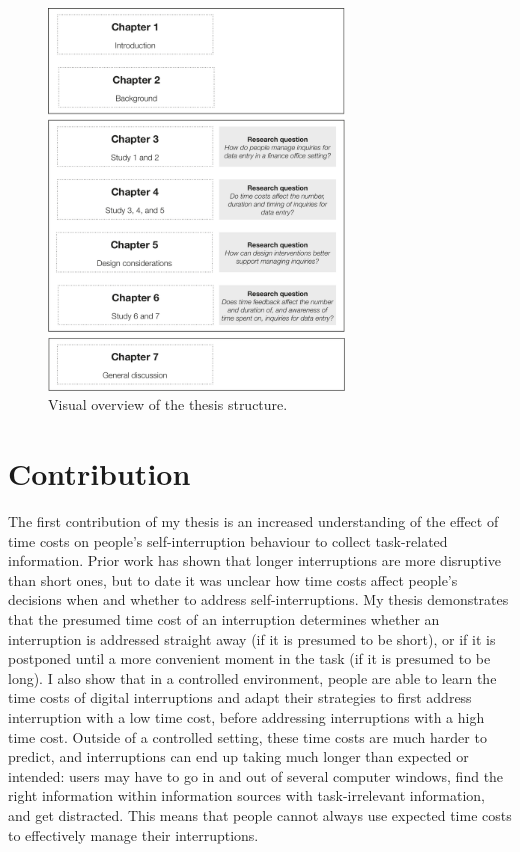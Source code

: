 \begin{figure}
\centering
\includegraphics[width=0.7\textwidth]{images/ThesisOverview.pdf}
\caption{Visual overview of the thesis structure.}
\label{fig:ch1-thesisoverview}
\end{figure}

\section{Contribution}
The first contribution of my thesis is an increased understanding of the effect of time costs on people's self-interruption behaviour to collect task-related information. Prior work has shown that longer interruptions are more disruptive than short ones, but to date it was unclear how time costs affect people's decisions when and whether to address self-interruptions. My thesis demonstrates that the presumed time cost of an interruption determines whether an interruption is addressed straight away (if it is presumed to be short), or if it is postponed until a more convenient moment in the task (if it is presumed to be long). I also show that in a controlled environment, people are able to learn the time costs of digital interruptions and adapt their strategies to first address interruption with a low time cost, before addressing interruptions with a high time cost. Outside of a controlled setting, these time costs are much harder to predict, and interruptions can end up taking much longer than expected or intended: users may have to go in and out of several computer windows, find the right information within information sources with task-irrelevant information, and get distracted. This means that people cannot always use expected time costs to effectively manage their interruptions. 

